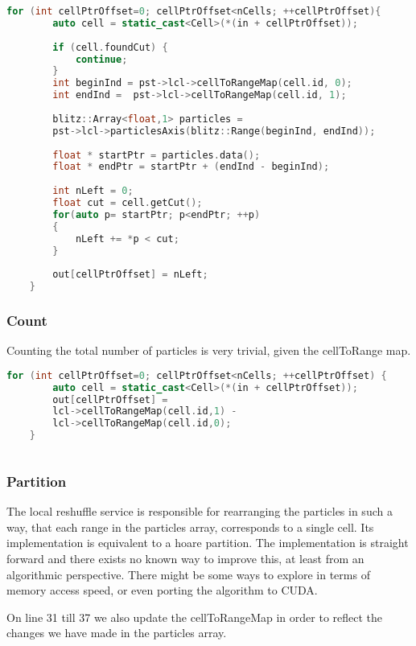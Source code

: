\documentclass[]{article}
\begin{document}
\begin{lstlisting}[language=c++]
	for (int cellPtrOffset=0; cellPtrOffset<nCells; ++cellPtrOffset){
		auto cell = static_cast<Cell>(*(in + cellPtrOffset));
		
		if (cell.foundCut) {
			continue;
		}
		int beginInd = pst->lcl->cellToRangeMap(cell.id, 0);
		int endInd =  pst->lcl->cellToRangeMap(cell.id, 1);
		
		blitz::Array<float,1> particles =
		pst->lcl->particlesAxis(blitz::Range(beginInd, endInd));
		
		float * startPtr = particles.data();
		float * endPtr = startPtr + (endInd - beginInd);
		
		int nLeft = 0;
		float cut = cell.getCut();
		for(auto p= startPtr; p<endPtr; ++p)
		{
			nLeft += *p < cut;
		}
		
		out[cellPtrOffset] = nLeft;
	}
\end{lstlisting}


\subsubsection{Count}

Counting the total number of particles is very trivial, given the cellToRange map. 

\begin{lstlisting}[language=c++]
	for (int cellPtrOffset=0; cellPtrOffset<nCells; ++cellPtrOffset) {
		auto cell = static_cast<Cell>(*(in + cellPtrOffset));
		out[cellPtrOffset] = 
		lcl->cellToRangeMap(cell.id,1) - 
		lcl->cellToRangeMap(cell.id,0);
	}
	
\end{lstlisting}

\subsubsection{Partition}
The local reshuffle service is responsible for rearranging the particles in such a way, that each range in the particles array, corresponds to a single cell. 
Its implementation is equivalent to a hoare partition. The implementation is straight forward and there exists no known way to improve this, at least from an algorithmic perspective. There might be some ways to explore in terms of memory access speed, or even porting the algorithm to CUDA. 

On line 31 till 37 we also update the cellToRangeMap in order to reflect the changes we have made in the particles array.
\end{document}
